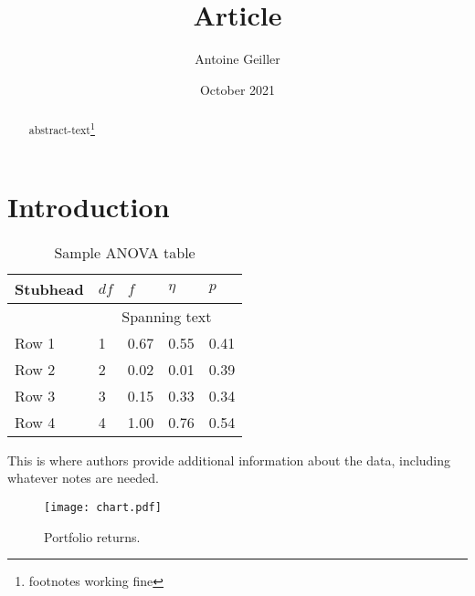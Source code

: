 \documentclass{article}
\title{Article}
\author{Antoine Geiller}
\affil{TeX.SX}
\date{October 2021}
\begin{document}
\maketitle

\begin{abstract}
    abstract-text\footnote{footnotes working fine}
\end{abstract}


\section{Introduction}

\blindtext[6]

\begin{table}
\centering
  \begin{threeparttable}
    \caption{Sample ANOVA table}
     \begin{tabular}{lllll}
        \toprule
        Stubhead & \( df \) & \( f \) & \( \eta \) & \( p \) \\
        \midrule
                 &     \multicolumn{4}{c}{Spanning text}     \\
        Row 1    & 1        & 0.67    & 0.55       & 0.41    \\
        Row 2    & 2        & 0.02    & 0.01       & 0.39    \\
        Row 3    & 3        & 0.15    & 0.33       & 0.34    \\
        Row 4    & 4        & 1.00    & 0.76       & 0.54    \\
        \bottomrule
     \end{tabular}
    \begin{tablenotes}
      \small
      \item This is where authors provide additional information about
      the data, including whatever notes are needed.
    \end{tablenotes}
  \end{threeparttable}
\end{table}


\begin{figure}[htp]
\begin{minipage}[b]{0.99\linewidth}
  \centering
  \texttt{[image: chart.pdf]}
  \caption{Portfolio returns.}
  \label{fig:blah1}
\end{minipage}
\end{figure}
\end{document}
